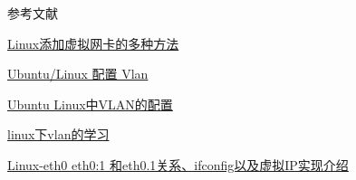 \documentclass[a4paper,left=1.5cm,right=1.5cm,11pt]{article}
\def\hang{\hangindent\parindent}
\def\textindent#1{\indent\llap{#1\enspace}\ignorespaces}
\def\re{\par\hang\textindent}
\begin{document}
\clearpage
\begin{center}%
参考文献
\end{center}
\re{[1]} \href{http://blog.csdn.net/hzhsan/article/details/44677867}{Linux添加虚拟网卡的多种方法}  
\re{[2]} \href{http://www.anrip.com/post/1766}{Ubuntu/Linux 配置 Vlan}
\re{[3]} \href{http://blog.sina.com.cn/s/blog_54559518010123u9.html}{Ubuntu Linux中VLAN的配置}
\re{[4]} \href{https://blog.blacate.me/2017/01/12/linux-vlan/}{linux下vlan的学习}
\re{[5]} \href{http://www.cnblogs.com/JohnABC/p/5951340.html}{Linux-eth0 eth0:1 和eth0.1关系、ifconfig以及虚拟IP实现介绍}
\end{document}
